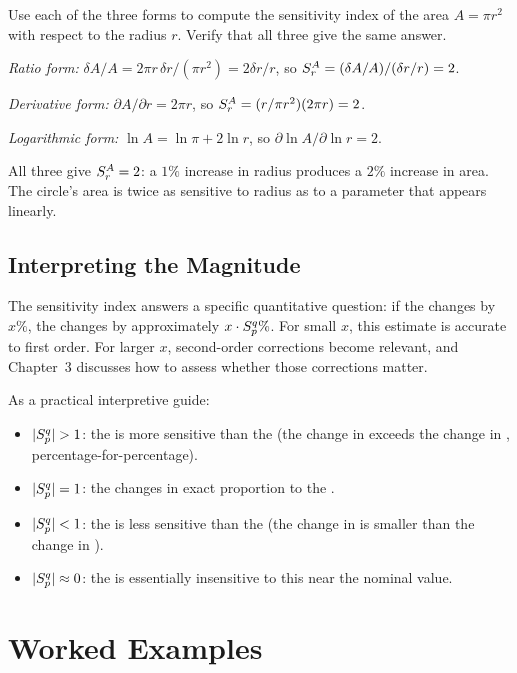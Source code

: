 \begin{selfcheck}
Use each of the three forms to compute the sensitivity index
of the area $A = \pi r^2$ with respect to the radius $r$.
Verify that all three give the same answer.
\end{selfcheck}
\begin{scAnswer}
\textit{Ratio form:} $\delta A / A = 2\pi r\,\delta r / (\pi r^2) = 2\delta r/r$,
so $S_{r}^{A} = (\delta A/A)/(\delta r/r) = 2$.

\textit{Derivative form:} $\partial A/\partial r = 2\pi r$, so
$S_{r}^{A} = (r/\pi r^2)(2\pi r) = 2$.

\textit{Logarithmic form:} $\ln A = \ln\pi + 2\ln r$, so
$\partial\ln A/\partial\ln r = 2$.

All three give $S_{r}^{A} = 2$: a $1\%$ increase in radius produces
a $2\%$ increase in area. The circle's area is twice as sensitive
to radius as to a parameter that appears linearly.
\end{scAnswer}

\subsection{Interpreting the Magnitude}
\label{subsec:magnitude}

The sensitivity index answers a specific quantitative question:
if the \POI changes by $x\%$, the \QOI changes by approximately $x \cdot S_{p}^{q}\%$.
For small $x$, this estimate is accurate to first order.
For larger $x$, second-order corrections become relevant, and
Chapter~3 discusses how to assess whether those corrections matter.

As a practical interpretive guide:
\begin{itemize}[nosep]
  \item $|S_{p}^{q}| > 1$: the \QOI is more sensitive than the \POI
        (the change in \QOI exceeds the change in \POI, percentage-for-percentage).
  \item $|S_{p}^{q}| = 1$: the \QOI changes in exact proportion to the \POI.
  \item $|S_{p}^{q}| < 1$: the \QOI is less sensitive than the \POI
        (the change in \QOI is smaller than the change in \POI).
  \item $|S_{p}^{q}| \approx 0$: the \QOI is essentially insensitive
        to this \POI near the nominal value.
\end{itemize}

\section{Worked Examples}
\label{sec:workedexamples}

